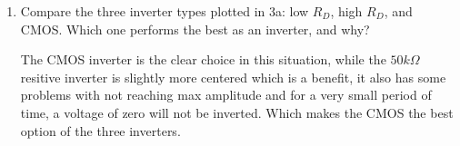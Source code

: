 \documentclass{article}
\begin{document}
\begin{enumerate}
\begin{enumerate}
\begin{center}
        \end{center}
        \item Compare the three inverter types plotted in 3a: low $R_D$, high $R_D$, and CMOS. Which one performs the best as an inverter, and why?
        \begin{center}
            The CMOS inverter is the clear choice in this situation, while the $50k\Omega$ resitive inverter is slightly more centered which is a benefit, it also has some problems with not reaching max amplitude and for a very small period of time, a voltage of zero will not be inverted. Which makes the CMOS the best option of the three inverters.
        \end{center}
    \end{enumerate}
\end{enumerate}
\end{document}
